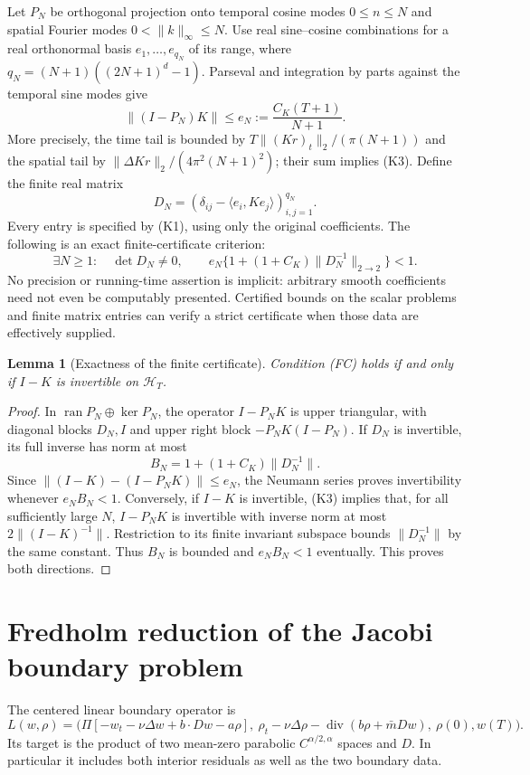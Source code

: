 \documentclass[11pt,a4paper]{article}
\newtheorem{lemma}[theorem]{Lemma}
\begin{document}
Let $P_N$ be orthogonal projection onto temporal cosine modes
$0\leq n\leq N$ and spatial Fourier modes
$0<\|k\|_\infty\leq N$. Use real sine--cosine combinations for a real
orthonormal basis $e_1,\ldots,e_{q_N}$ of its range, where
$q_N=(N+1)((2N+1)^d-1)$. Parseval and integration by parts against
the temporal sine modes give
\begin{equation}\tag{K3}\label{K3}
 \|(I-P_N)K\|\leq e_N:=\frac{C_K(T+1)}{N+1}.
\end{equation}
More precisely, the time tail is bounded by
$T\|(Kr)_t\|_2/(\pi(N+1))$ and the spatial tail by
$\|\Delta Kr\|_2/(4\pi^2(N+1)^2)$; their sum implies (K3).
Define the finite real matrix
\begin{equation}\tag{K4}\label{K4}
 D_N=(\delta_{ij}-\langle e_i,Ke_j\rangle)_{i,j=1}^{q_N}.
\end{equation}
Every entry is specified by (K1), using only the original coefficients.
The following is an exact finite-certificate criterion:
\begin{equation}\tag{FC}\label{FC}
 \boxed{\quad\exists N\geq1:\quad \det D_N\ne0,\qquad
 e_N\{1+(1+C_K)\|D_N^{-1}\|_{2\to2}\}<1.\quad}
\end{equation}
No precision or running-time assertion is implicit: arbitrary smooth
coefficients need not even be computably presented. Certified bounds
on the scalar problems and finite matrix entries can verify a strict
certificate when those data are effectively supplied.

\begin{lemma}[Exactness of the finite certificate]\label{finite}
Condition (FC) holds if and only if $I-K$ is invertible on
$\mathcal H_T$.
\end{lemma}
\begin{proof}
In $\operatorname{ran}P_N\oplus\ker P_N$, the operator $I-P_NK$ is
upper triangular, with diagonal blocks $D_N,I$ and upper right block
$-P_NK(I-P_N)$. If $D_N$ is invertible, its full inverse has norm at most
\[
 B_N=1+(1+C_K)\|D_N^{-1}\|.
\]
Since $\|(I-K)-(I-P_NK)\|\leq e_N$, the Neumann series proves
invertibility whenever $e_NB_N<1$.
Conversely, if $I-K$ is invertible, (K3) implies that, for all sufficiently
large $N$, $I-P_NK$ is invertible with inverse norm at most
$2\|(I-K)^{-1}\|$. Restriction to its finite invariant subspace bounds
$\|D_N^{-1}\|$ by the same constant. Thus $B_N$ is bounded and
$e_NB_N<1$ eventually. This proves both directions.
\end{proof}

\section{Fredholm reduction of the Jacobi boundary problem}
The centered linear boundary operator is
\begin{equation}\tag{L1}\label{L1}
 L(w,\rho)=\bigl(\Pi[-w_t-\nu\Delta w+b\cdot Dw-a\rho],\
 \rho_t-\nu\Delta\rho-\operatorname{div}(b\rho+\bar m Dw),\
 \rho(0),w(T)\bigr).
\end{equation}
Its target is the product of two mean-zero parabolic
$C^{\alpha/2,\alpha}$ spaces and $D$. In particular it includes both
interior residuals as well as the two boundary data.
\end{document}
